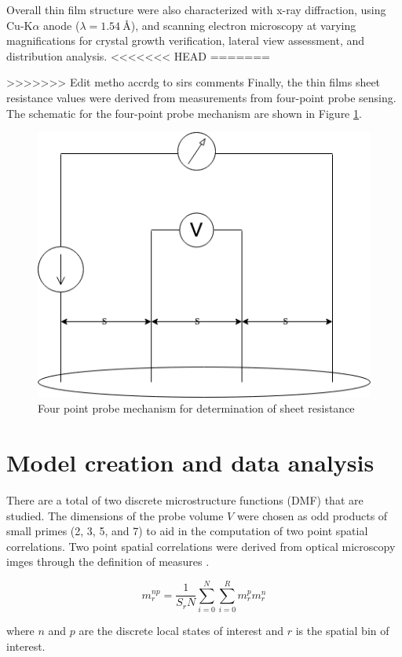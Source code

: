 Overall thin film structure were also characterized with x-ray diffraction, using Cu-K$\alpha$ anode ($\lambda = \SI{1.54}{\angstrom}$), and scanning electron microscopy at varying magnifications for crystal growth verification, lateral view assessment, and distribution analysis.
<<<<<<< HEAD
=======

>>>>>>> Edit metho accrdg to sirs comments
Finally, the thin films sheet resistance values were derived from measurements from four-point probe sensing.
The schematic for the four-point probe mechanism are shown in Figure \ref{fig:fpt}.

\begin{figure}
  \centering
  \includegraphics[scale=0.3]{FourPoint}
  \caption{Four point probe mechanism for determination of sheet resistance}
  \label{fig:fpt}
\end{figure}

\section{Model creation and data analysis}
There are a total of two discrete microstructure functions (DMF) that are studied.
The dimensions of the probe volume $V$ were chosen as odd products of small primes (2, 3, 5, and 7) to aid in the computation of two point spatial correlations.
Two point spatial correlations were derived from optical microscopy imges through the definition of measures \cite{gupta15}.

\[
  m^{np}_r = \dfrac{1}{S_rN} \sum_{i=0}^{N} \sum_{i=0}^{R} m^p_r m^n_r
\]

where $n$ and $p$ are the discrete local states of interest and $r$ is the spatial bin of interest.

